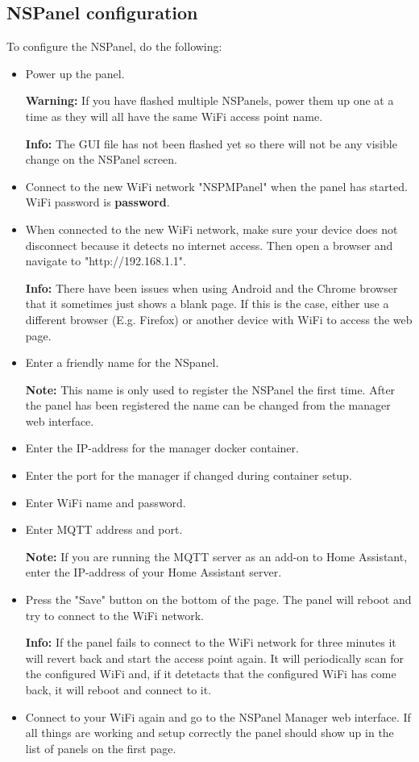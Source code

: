\documentclass[10pt]{article}
\newcommand{\info}[1]{\begin{infoBox} \textbf{Info:} #1 \end{infoBox}}
\newcommand{\note}[1]{\begin{noteBox} \textbf{Note:} #1 \end{noteBox}}
\newcommand{\warning}[1]{\begin{hintBox} \textbf{Warning:} #1 \end{hintBox}}
\begin{document}
    \subsection{NSPanel configuration}
    \label{sec:nspanel_configuration}
    To configure the NSPanel, do the following:
    \begin{itemize}
      \item Power up the panel.
      \warning{If you have flashed multiple NSPanels, power them up one at a time as they will all have the same WiFi access point name.}
      \info{The GUI file has not been flashed yet so there will not be any visible change on the NSPanel screen.}
      \item Connect to the new WiFi network "NSPMPanel" when the panel has started. WiFi password is \textbf{password}.
      \item When connected to the new WiFi network, make sure your device does not disconnect because it detects no internet access. Then open a browser and navigate to "http://192.168.1.1".
      \info{There have been issues when using Android and the Chrome browser that it sometimes just shows a blank page. If this is the case, either use a different browser (E.g. Firefox) or another device with WiFi to access the web page.}
      \item Enter a friendly name for the NSpanel.
      \note{This name is only used to register the NSPanel the first time. After the panel has been registered the name can be changed from the manager web interface.}
      \item Enter the IP-address for the manager docker container.
      \item Enter the port for the manager if changed during container setup.
      \item Enter WiFi name and password.
      \item Enter MQTT address and port.
      \note{If you are running the MQTT server as an add-on to Home Assistant, enter the IP-address of your Home Assistant server.}
      \item Press the "Save" button on the bottom of the page. The panel will reboot and try to connect to the WiFi network.
      \info{If the panel fails to connect to the WiFi network for three minutes it will revert back and start the access point again. It will periodically scan for the configured WiFi and, if it detetacts that the configured WiFi has come back, it will reboot and connect to it.}
      \item Connect to your WiFi again and go to the NSPanel Manager web interface. If all things are working and setup correctly the panel should show up in the list of panels on the first page.

\end{itemize}
\end{document}
